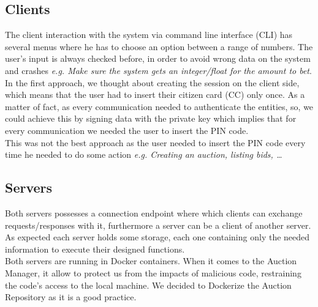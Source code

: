 \documentclass[12pt]{article}
\begin{document}
\subsection{Clients}
\label{subsec:clients}
The client interaction with the system via command line interface (CLI) has several menus where
  he has to choose an option between a range of numbers. The user's input is always
  checked before, in order to avoid wrong data on the system and crashes \textit{e.g. Make sure the system gets an integer/float for the amount to bet}.\\

In the first approach, we thought about creating the session on the client side, which means that
  the user had to insert their citizen card (CC) only once. As a matter of fact, as every communication
  needed to authenticate the entities, so, we could achieve this by signing data with the private key
  which implies that for every communication we needed the user to insert the PIN code.\\
  This was not the best approach as the user needed to insert the PIN code every time he needed to do some action \textit{e.g. Creating an auction, listing bids, \ldots }


\subsection{Servers}
Both servers possesses a connection endpoint where which clients can exchange requests/responses with it, furthermore 
a server can be a client of another server. \\
As expected each server holds some storage, each one containing only the needed information to execute their designed functions.\\

Both servers are running in Docker containers. When it comes to the Auction Manager, it allow to protect us from the impacts of malicious code, restraining the code's access to the local machine. We decided to Dockerize the Auction Repository as it is a good practice.
\end{document}
